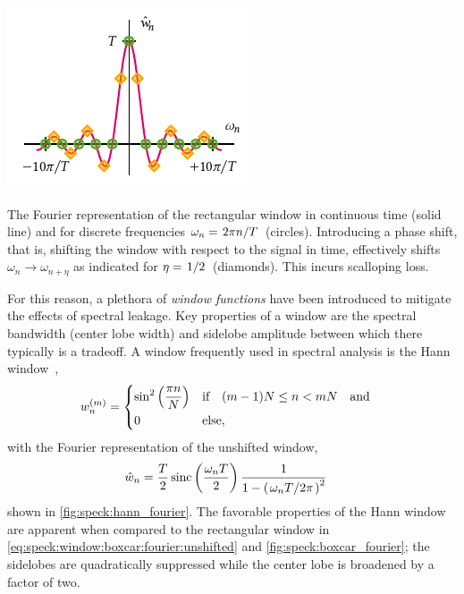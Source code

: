 \begin{marginfigure}
    \centering
    \includegraphics{img/pdf/spectrometer/rect}
    \caption[]{
        The Fourier representation of the rectangular window in continuous time (solid line) and for discrete frequencies $\omega_n = \flatfrac{2\pi n}{T}$ (circles).
        Introducing a phase shift, that is, shifting the window with respect to the signal in time, effectively shifts $\omega_n \to \omega_{n+\eta}$ as indicated for $\eta=\flatfrac{1}{2}$ (diamonds).
        This incurs scalloping loss.
    }
    \label{fig:speck:boxcar_fourier}
\end{marginfigure}

For this reason, a plethora of \emph{window functions} have been introduced to mitigate the effects of spectral leakage.
Key properties of a window are the spectral bandwidth (center lobe width) and sidelobe amplitude between which there typically is a tradeoff.
A window frequently used in spectral analysis is the Hann window~\cite{Nuttall1981},
\begin{align}\label{eq:speck:window:hann}
    w_n\gth{m} =
    \begin{dcases}
        \sin^2\left(\frac{\pi n}{N}\right) &\qif* (m - 1)N\leq n < mN\qand \\
        0 &\text{else},
    \end{dcases}
\end{align}
with the Fourier representation of the unshifted window,
\begin{align}\label{eq:speck:window:hann:fourier_unshifted}
    \hat{w}_n &= \frac{T}{2}\sinc\left(\frac{\omega_n T}{2}\right)
                    \frac{1}{1 - \left(\flatfrac{\omega_n T}{2\pi}\right)^2}
\end{align}
shown in \cref{fig:speck:hann_fourier}.
The favorable properties of the Hann window are apparent when compared to the rectangular window in \cref{eq:speck:window:boxcar:fourier:unshifted} and \cref{fig:speck:boxcar_fourier}; the sidelobes are quadratically suppressed while the center lobe is broadened by a factor of two.

